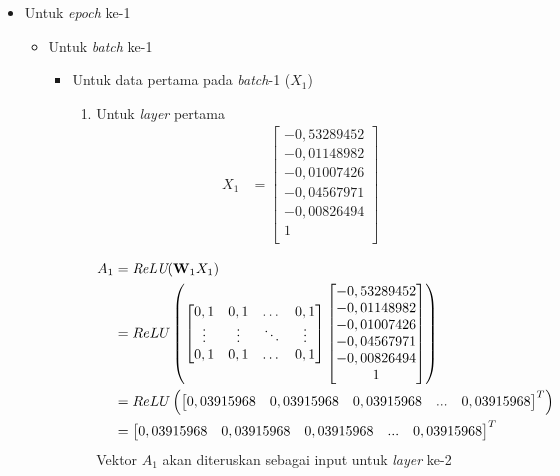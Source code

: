 \documentclass[a4paper,12pt]{report}
\begin{document}
\begin{itemize}
	\item Untuk \textit{epoch} ke-1
	\begin{itemize}
		\item Untuk \textit{batch} ke-1
		\begin{itemize}
			\item Untuk data pertama pada \textit{batch}-1 ($X_1$)
			\begin{enumerate}
				\item Untuk \textit{layer} pertama
				\begin{equation}
					\begin{split}
						X_1 &= \begin{bmatrix}
							-0,53289452 \\
							-0,01148982 \\
							-0,01007426 \\
							-0,04567971 \\
							-0,00826494 \\
							1 \\
						\end{bmatrix} \\
					\end{split}
				\end{equation}
				\begin{equation}
					\begin{split}
						A_1 &= \textit{ReLU}(\mathbf{W}_1X_1) \\
						&= ReLU \left(
						\begin{bmatrix}
							0,1 & 0,1 & \dots & 0,1 \\
							\vdots & \vdots & \ddots & \vdots \\
							0,1 & 0,1 & \dots & 0,1 \\
						\end{bmatrix} \begin{bmatrix}
							-0,53289452 \\
							-0,01148982 \\
							-0,01007426 \\
							-0,04567971 \\
							-0,00826494 \\
							1 \\
						\end{bmatrix}
						\right) \\ 
						&= ReLU \left(\begin{bmatrix} 0,03915968 &  0,03915968 & 0,03915968 & ... &  0,03915968 \end{bmatrix}^{T} \right) \notag\\ 
						&= \begin{bmatrix} 0,03915968 &  0,03915968 & 0,03915968 & ... &  0,03915968 \end{bmatrix}^{T}
					\end{split}
				\end{equation}
				Vektor $A_1$ akan diteruskan sebagai input untuk \textit{layer} ke-2
				

\end{enumerate}
\end{itemize}
\end{itemize}
\end{itemize}
\end{document}
